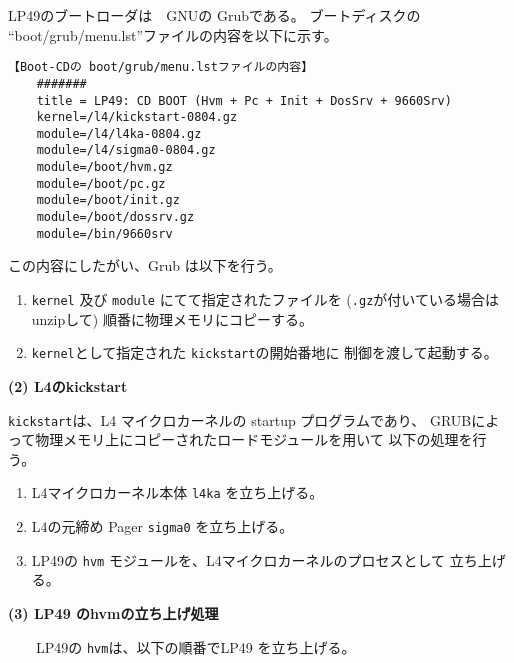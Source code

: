   LP49のブートローダは　GNUの Grubである。
ブートディスクの ``boot/grub/menu.lst''ファイルの内容を以下に示す。

{\small
\begin{verbatim}
【Boot-CDの boot/grub/menu.lstファイルの内容】
    #######
    title = LP49: CD BOOT (Hvm + Pc + Init + DosSrv + 9660Srv)
    kernel=/l4/kickstart-0804.gz
    module=/l4/l4ka-0804.gz
    module=/l4/sigma0-0804.gz
    module=/boot/hvm.gz
    module=/boot/pc.gz
    module=/boot/init.gz
    module=/boot/dossrv.gz
    module=/bin/9660srv
\end{verbatim}
}

この内容にしたがい、Grub は以下を行う。
\begin{enumerate}
\item  {\tt kernel} 及び {\tt module} にてて指定されたファイルを
     ({\tt .gz}が付いている場合はunzipして)
     順番に物理メモリにコピーする。

\item  {\tt kernel}として指定された {\tt kickstart}の開始番地に
  制御を渡して起動する。
\end{enumerate}


{\bf\flushleft (2) L4のkickstart}

 {\tt kickstart}は、L4 マイクロカーネルの startup プログラムであり、
GRUBによって物理メモリ上にコピーされたロードモジュールを用いて
以下の処理を行う。

\begin{enumerate}
\item  L4マイクロカーネル本体 {\tt l4ka} を立ち上げる。

\item  L4の元締め Pager {\tt sigma0} を立ち上げる。

\item  LP49の {\tt hvm} モジュールを、L4マイクロカーネルのプロセスとして
      立ち上げる。　

\end{enumerate}


{\bf\flushleft (3) LP49 のhvmの立ち上げ処理 }

　　LP49の {\tt hvm}は、以下の順番でLP49 を立ち上げる。

